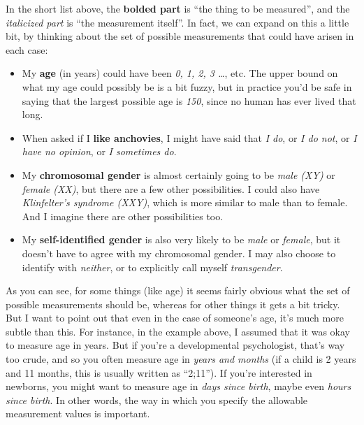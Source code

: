 \documentclass[]{book}
\begin{document}
In the short list above, the {\textbf{bolded part}} is ``the thing to be measured'', and the {\emph{italicized part}} is ``the measurement itself''. In fact, we can expand on this a little bit, by thinking about the set of possible measurements that could have arisen in each case:

\begin{itemize}
\item
  My {\textbf{age}} (in years) could have been {\emph{0, 1, 2, 3 \ldots{}}}, etc. The upper bound on what my age could possibly be is a bit fuzzy, but in practice you'd be safe in saying that the largest possible age is {\emph{150}}, since no human has ever lived that long.
\item
  When asked if I {\textbf{like anchovies}}, I might have said that {\emph{I do}}, or {\emph{I do not}}, or {\emph{I have no opinion}}, or {\emph{I sometimes do}}.
\item
  My {\textbf{chromosomal gender}} is almost certainly going to be {\emph{male (XY)}} or {\emph{female (XX)}}, but there are a few other possibilities. I could also have {\emph{Klinfelter's syndrome (XXY)}}, which is more similar to male than to female. And I imagine there are other possibilities too.
\item
  My {\textbf{self-identified gender}} is also very likely to be {\emph{male}} or {\emph{female}}, but it doesn't have to agree with my chromosomal gender. I may also choose to identify with {\emph{neither}}, or to explicitly call myself {\emph{transgender}}.
\end{itemize}

As you can see, for some things (like age) it seems fairly obvious what the set of possible measurements should be, whereas for other things it gets a bit tricky. But I want to point out that even in the case of someone's age, it's much more subtle than this. For instance, in the example above, I assumed that it was okay to measure age in years. But if you're a developmental psychologist, that's way too crude, and so you often measure age in {\emph{years and months}} (if a child is 2 years and 11 months, this is usually written as ``2;11''). If you're interested in newborns, you might want to measure age in {\emph{days since birth}}, maybe even {\emph{hours since birth}}. In other words, the way in which you specify the allowable measurement values is important.
\end{document}
